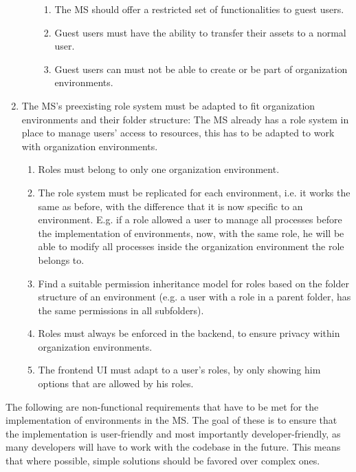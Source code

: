 \begin{enumerate}
\begin{enumerate}
\begin{enumerate}
			            \item The MS should offer a restricted set of functionalities to guest
			                  users.

			            \item Guest users must have the ability to transfer their assets to a normal user.

			            \item Guest users can must not be able to create or be part of organization environments.
		            \end{enumerate}

	      \end{enumerate}


	\item The MS's preexisting role system must be adapted to fit organization environments
	      and their folder structure:
	      The MS already has a role system in place to manage users' access to resources,
	      this has to be adapted to work with organization environments.
	      \begin{enumerate}
		      \item Roles must belong to only one organization environment.
		      \item The role system must be replicated for each environment, i.e. it works the
		            same as before, with the difference that it is now specific to an environment.
		            E.g. if a role allowed a user to manage all processes before the implementation of
		            environments, now, with the same role, he will be able to modify all processes
		            inside the organization environment the role belongs to.
		      \item Find a suitable permission inheritance model for roles based on the folder
		            structure of an environment (e.g. a user with a role in a parent
		            folder, has the same permissions in all subfolders).

		      \item Roles must always be enforced in the backend, to ensure privacy within
		            organization environments.

		      \item The frontend UI must adapt to a user's roles, by only showing him options that
		            are allowed by his roles.
	      \end{enumerate}
\end{enumerate}

The following are non-functional requirements that have to be met for the implementation
of environments in the MS.
The goal of these is to ensure that the implementation is user-friendly and most
importantly developer-friendly, as many developers will have to work with the codebase in
the future.
This means that where possible, simple solutions should be favored over complex ones.

